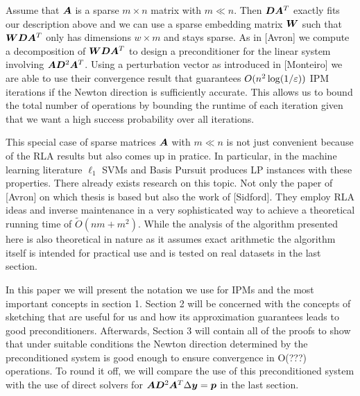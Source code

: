 Assume that \(\bm{A}\) is a sparse \(m \times n\) matrix with \(m \ll n\). Then \(\bm{D} \bm{A}^T\) exactly fits our description above and we can use a sparse embedding matrix \(\bm{W}\) such that \(\bm{W}\bm{D}\bm{A}^T\) only has dimensions \(w \times m\) and stays sparse.
As in [Avron] we compute a decomposition of \(\bm{W}\bm{D}\bm{A}^T\) to design a preconditioner for the linear system involving \(\bm{A}\bm{D}^2\bm{A}^T\).
Using a perturbation vector as introduced in [Monteiro] we are able to use their convergence result that guarantees \(O(n^2 \log(1/\varepsilon))\) IPM iterations if the Newton direction is sufficiently accurate.
This allows us to bound the total number of operations by bounding the runtime of each iteration given that we want a high success probability over all iterations.

This special case of sparse matrices \(\bm{A}\) with \(m \ll n\) is not just convenient because of the RLA results but also comes up in pratice.
In particular, in the machine learning literature \(\ell_1\) SVMs and Basis Pursuit produces LP instances with these properties.
There already exists research on this topic.
Not only the paper of [Avron] on which thesis is based but also the work of [Sidford].
They employ RLA ideas and inverse maintenance in a very sophisticated way to achieve a theoretical running time of \(\tilde{O}(nm + m^2)\).
While the analysis of the algorithm presented here is also theoretical in nature as it assumes exact arithmetic the algorithm itself is intended for practical use and is tested on real datasets in the last section.

In this paper we will present the notation we use for IPMs and the most important concepts in section 1.
Section 2 will be concerned with the concepts of sketching that are useful for us and how its approximation guarantees leads to good preconditioners.
Afterwards, Section 3 will contain all of the proofs to show that under suitable conditions the Newton direction determined by the preconditioned system is good enough to ensure convergence in O(???) operations.
To round it off, we will compare the use of this preconditioned system with the use of direct solvers for \(\bm{A}\bm{D}^2\bm{A}^T \Delta \bm{y} = \bm{p}\) in the last section.